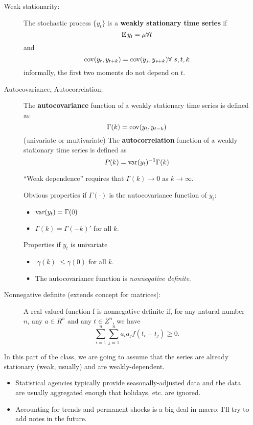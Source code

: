\begin{description}
\item[Weak stationarity:]
  The stochastic process $\{y_t\}$ is a \textbf{weakly stationary time
    series} if
  \[ \operatorname{E} y_t = \mu \forall t \] and
  \[\cov(y_t, y_{t+k}) = \cov(y_s, y_{s+k}) \forall\ s,t, k\] informally, the
  first two moments do not depend on $t$.
\item[Autocovariance, Autocorrelation:]
  The \textbf{autocovariance} function of a weakly stationary time
  series is defined as
  \[\Gamma(k) = \operatorname{cov}(y_t, y_{t-k})\] (univariate or multivariate) The
  \textbf{autocorrelation} function of a weakly stationary time series
  is defined as
  \[
  P(k) = \operatorname{var}(y_t)^{-1} \Gamma(k)
  \]

  ``Weak dependence'' requires that $\Gamma(k) \to 0$ as $k \to \infty$.

  Obvious properties if $\Gamma(\cdot)$ is the autocovariance function of
  $y_t$:
  \begin{itemize}
  \item $\operatorname{var}(y_t) = \Gamma(0)$
  \item $\Gamma(k) = \Gamma(-k)'$ for all $k$.
  \end{itemize}

  Properties if $y_t$ is univariate
  \begin{itemize}
  \item $|\gamma(k)| \leq \gamma(0)$ for all $k$.
  \item The autocovariance function is \emph{nonnegative definite}.
  \end{itemize}
\item[Nonnegative definite (extends concept for matrices):]

  A real-valued function f is nonnegative definite if, for any natural
  number $n$, any $a \in R^n$ and any $t \in Z^n$, we have
  \[\sum_{i=1}^n \sum_{j=1}^n a_i a_j f(t_i - t_j) \geq 0.\]
\end{description}

In this part of the class, we are going to assume that the series are
already stationary (weak, usually) and are weakly-dependent.

\begin{itemize}
\item Statistical agencies typically provide seasonally-adjusted data
  and the data are usually aggregated enough that holidays, etc. are
  ignored.
\item Accounting for trends and permanent shocks is a big deal in
  macro; I'll try to add notes in the future.
\end{itemize}

